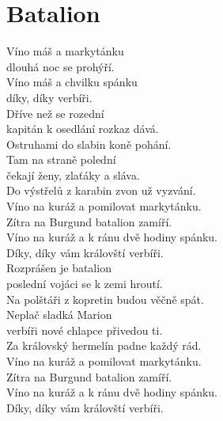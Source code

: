 \section{Batalion}
\onehalfspacing

Víno máš a markytánku\\
dlouhá noc se prohýří.\\
Víno máš a chvilku spánku\\
díky, díky verbíři.\\

Dříve než se rozední\\
kapitán k osedlání rozkaz dává.\\
Ostruhami do slabin koně pohání.\\
Tam na straně polední\\
čekají ženy, zlaťáky a sláva.\\
Do výstřelů z karabin zvon už vyzvání.\\

{}Víno na kuráž a pomilovat markytánku.\\
Zítra na Burgund batalion zamíří.\\
Víno na kuráž a k ránu dvě hodiny spánku.\\
Díky, díky vám královští verbíři.\\

Rozprášen je batalion\\
poslední vojáci se k zemi hroutí.\\
Na polštáři z kopretin budou věčně spát.\\
Neplač sladká Marion\\
verbíři nové chlapce přivedou ti.\\
Za královský hermelín padne každý rád.\\

Víno na kuráž a pomilovat markytánku.\\
Zítra na Burgund batalion zamíří.\\
Víno na kuráž a k ránu dvě hodiny spánku.\\
Díky, díky vám královští verbíři.
